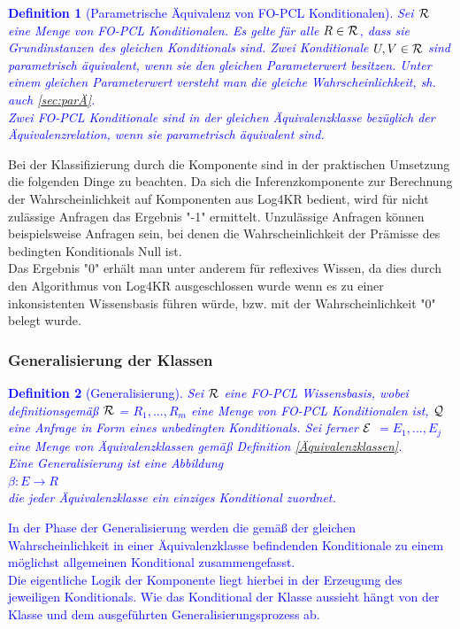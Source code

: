 \documentclass[a4paper, 11pt]{book}
\newtheorem{Def}{Definition }[section]
\begin{document}
\textcolor{blue}{
\begin{Def}[Parametrische Äquivalenz von FO-PCL Konditionalen] \label{Äquivalenz in FO-PCL}  
	Sei $  \cal{R} $ eine Menge von FO-PCL Konditionalen. Es gelte für alle $ R \in \cal{R} $, dass sie Grundinstanzen des gleichen Konditionals sind. Zwei Konditionale $ U,V \in \cal{R} $ sind parametrisch äquivalent, wenn sie den gleichen Parameterwert besitzen. Unter einem gleichen Parameterwert versteht man die gleiche Wahrscheinlichkeit, sh. auch \ref{sec:parÄ}.\\
	Zwei FO-PCL Konditionale sind in der gleichen Äquivalenzklasse bezüglich der Äquivalenzrelation, wenn sie parametrisch äquivalent sind. \label{Äquivalenzklassen} 
\end{Def}
}




Bei der Klassifizierung durch die Komponente sind in der praktischen Umsetzung die folgenden Dinge zu beachten. 
Da sich die Inferenzkomponente zur Berechnung der Wahrscheinlichkeit auf Komponenten aus Log4KR bedient, wird für nicht zulässige Anfragen das Ergebnis "{}-1"{} ermittelt. Unzulässige Anfragen können beispielsweise Anfragen sein, bei denen die Wahrscheinlichkeit der Prämisse des bedingten Konditionals Null ist.\\
Das Ergebnis  "{}0"{} erhält man unter anderem für reflexives Wissen, da dies durch den Algorithmus von Log4KR ausgeschlossen wurde wenn es zu einer inkonsistenten Wissensbasis führen würde, bzw. mit der Wahrscheinlichkeit  "{}0"{} belegt wurde. 
	
	
	
	
\subsubsection{Generalisierung der Klassen}
\textcolor{blue}{
\begin{Def}[Generalisierung] \label{Generalisierung}
	Sei $\cal{R}$ eine FO-PCL Wissensbasis, wobei definitionsgemäß $\cal{R}$  = $ {R_1, ..., R_m} $ eine Menge von FO-PCL Konditionalen ist, $ \cal{Q} $ eine Anfrage in Form eines unbedingten Konditionals. Sei ferner $ \cal{E}$  $ = {E_1, ..., E_j}$ eine Menge von Äquivalenzklassen gemäß Definition \ref{Äquivalenzklassen}.\\
	Eine Generalisierung ist eine Abbildung\\
	\hspace{3.0 cm} $ \beta:  E \rightarrow  R $\\
	die jeder Äquivalenzklasse ein einziges Konditional zuordnet. 
\end{Def}
In der Phase der Generalisierung werden die gemäß der gleichen Wahrscheinlichkeit in einer Äquivalenzklasse befindenden Konditionale zu einem möglichst allgemeinen Konditional zusammengefasst.\\
Die eigentliche Logik der Komponente liegt hierbei in der Erzeugung des jeweiligen Konditionals. Wie das Konditional der Klasse aussieht hängt von der Klasse und dem ausgeführten Generalisierungsprozess ab. }
\end{document}
